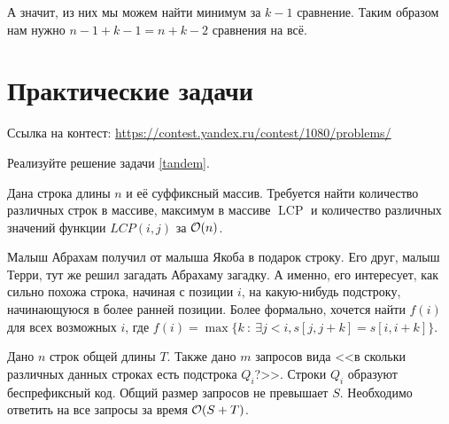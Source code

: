 \documentclass[addpoints]{exam}
\DeclareMathOperator{\LCP}{LCP}
\begin{document}
\begin{questions}
\begin{solution}
А значит, из них мы можем найти минимум за $k-1$ сравнение. Таким образом нам нужно $n-1+k-1=n+k-2$ сравнения на всё.

\end{solution}


\section{Практические задачи}

Ссылка на контест: \url{https://contest.yandex.ru/contest/1080/problems/}

\question[1] Реализуйте решение задачи \ref{tandem}.

\question[1] Дана строка длины $n$ и её суффиксный массив. Требуется найти количество различных строк в массиве, максимум в массиве $\LCP$ и количество различных значений функции $LCP(i,j)$ за $\mathcal{O}(n)$.
 
\question[1] Малыш Абрахам получил от малыша Якоба в подарок строку. Его друг, малыш Терри, тут же решил загадать Абрахаму загадку. А именно, его интересует, как сильно похожа строка, начиная с позиции $i$, на какую-нибудь подстроку, начинающуюся в более ранней позиции. Более формально, хочется найти $f(i)$ для всех возможных $i$, где $f(i) = \max\{k\ :\ \exists j<i, s[j,j+k]=s[i,i+k]\}$.

\question[2] Дано $n$ строк общей длины $T$. Также дано $m$ запросов вида <<в скольки различных данных строках есть подстрока $Q_i$?>>. Строки $Q_i$ образуют беспрефиксный код. Общий размер запросов не превышает $S$. Необходимо ответить на все запросы за время $\mathcal{O}(S + T)$.
 
\begin{center}
\pointtable[h][questions]
\end{center}

\end{questions}
\end{document}

